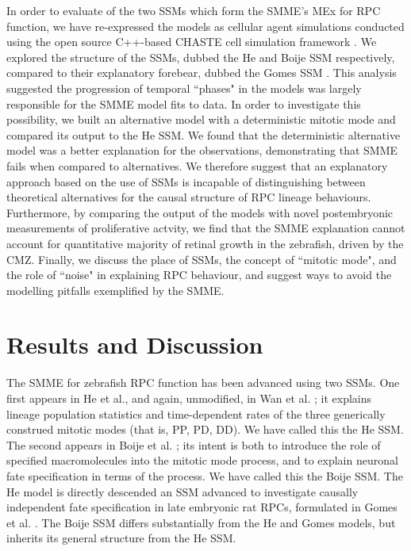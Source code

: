 In order to evaluate of the two SSMs which form the SMME's MEx for RPC function, we have re-expressed the models as cellular agent simulations conducted using the open source C++-based CHASTE cell simulation framework \cite{Mirams2013}. We explored the structure of the SSMs, dubbed the He and Boije SSM respectively, compared to their explanatory forebear, dubbed the Gomes SSM \cite{Gomes2011}. This analysis suggested the progression of temporal ``phases" in the models was largely responsible for the SMME model fits to data. In order to investigate this possibility, we built an alternative model with a deterministic mitotic mode and compared its output to the He SSM. We found that the deterministic alternative model was a better explanation for the observations, demonstrating that SMME fails when compared to alternatives. We therefore suggest that an explanatory approach based on the use of SSMs is incapable of distinguishing between theoretical alternatives for the causal structure of RPC lineage behaviours. Furthermore, by comparing the output of the models with novel postembryonic measurements of proliferative actvity, we find that the SMME explanation cannot account for quantitative majority of retinal growth in the zebrafish, driven by the CMZ. Finally, we discuss the place of SSMs, the concept of ``mitotic mode", and the role of ``noise" in explaining RPC behaviour, and suggest ways to avoid the modelling pitfalls exemplified by the SMME.

\section{Results and Discussion}

The SMME for zebrafish RPC function has been advanced using two SSMs. One first appears in He et al., and again, unmodified, in Wan et al. \cite{He2012,Wan2016}; it explains lineage population statistics and time-dependent rates of the three generically construed mitotic modes (that is, PP, PD, DD). We have called this the He SSM. The second appears in Boije et al. \cite{Boije2015}; its intent is both to introduce the role of specified macromolecules into the mitotic mode process, and to explain neuronal fate specification in terms of the process. We have called this the Boije SSM. The He model is directly descended an SSM advanced to investigate causally independent fate specification in late embryonic rat RPCs, formulated in Gomes et al. \cite{Gomes2011}. The Boije SSM differs substantially from the He and Gomes models, but inherits its general structure from the He SSM.

